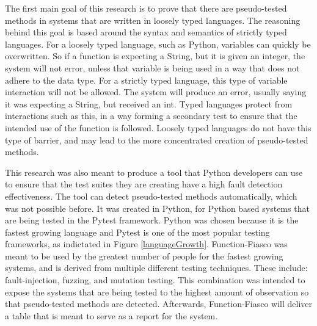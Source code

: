 The first main goal of this research is to prove that there are pseudo-tested methods in systems that are written in loosely typed languages. The reasoning behind this goal is based around the syntax and semantics of strictly typed languages. For a loosely typed language, such as Python, variables can quickly be overwritten. So if a function is expecting a String, but it is given an integer, the system will not error, unless that variable is being used in a way that does not adhere to the data type. For a strictly typed language, this type of variable interaction will not be allowed. The system will produce an error, usually saying it was expecting a String, but received an int. Typed languages protect from interactions such as this, in a way forming a secondary test to ensure that the intended use of the function is followed. Loosely typed languages do not have this type of barrier, and may lead to the more concentrated creation of pseudo-tested methods.

This research was also meant to produce a tool that Python developers can use to ensure that the test suites they are creating have a high fault detection effectiveness. The tool can detect pseudo-tested methods automatically, which was not possible before. It was created in Python, for Python based systems that are being tested in the Pytest framework. Python was chosen because it is the fastest growing language and Pytest is one of the most popular testing frameworks, as indictated in Figure \ref{languageGrowth}. Function-Fiasco was meant to be used by the greatest number of people for the fastest growing systems, and is derived from multiple different testing techniques. These include: fault-injection, fuzzing, and mutation testing. This combination was intended to expose the systems that are being tested to the highest amount of observation so that pseudo-tested methods are detected. Afterwards, Function-Fiasco will deliver a table that is meant to serve as a report for the system.

